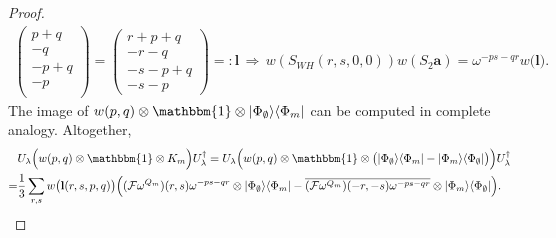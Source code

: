 \documentclass[aps,nofootinbib,floatfix,a4paper]{revtex4}
\newcommand{\1}{\mbox{$\mathbf{1}$}}
\def\F{\mathcal{F}}
\def\Id{\mathbbm{1}}
\renewcommand{\vec}{\mathbf}
\begin{document}
\begin{proof}
\begin{align*}
\begin{pmatrix}
			p+q\\
			-q\\
			-p+q\\
			-p\\
		\end{pmatrix}
		=
		\begin{pmatrix}
			r+p+q\\
			-r-q\\
			-s-p+q\\
			-s-p
		\end{pmatrix}
		=: \vec l
		\,\Rightarrow\,
		w(S_{WH} (r,s,0,0)) w(S_2 \vec a)
		=
		\omega^{-ps-qr}    %
		w\big(\vec l\big).
	\end{align*}
	The image of $ w(p,q)\otimes\Id \otimes |\Phi_\emptyset\rangle\langle\Phi_m|$ can be computed in complete analogy.
	Altogether,
	\begin{align}%
		&
		U_\lambda
		\Big(
			w(p,q)\otimes\Id
			\otimes 
			K_m
		\Big)
		U_\lambda^\dagger
		=
		U_\lambda
		\Big(
			w(p,q)\otimes\Id
			\otimes 
			\big(
				|\Phi_\emptyset\rangle\langle\Phi_m|
				-
				|\Phi_m\rangle\langle\Phi_\emptyset|
			\big)
		\Big)
		U_\lambda^\dagger
		\nonumber \\
		=&
			\frac1{3}
			\sum_{r,s}
			w\big(\vec l(r,s,p,q)\big)
		\Big(
			(\F \omega^{Q_m})(r,s)
				\omega^{-ps-qr}
				\otimes 
				|\Phi_\emptyset\rangle\langle\Phi_m|
				-
				\overline{(\F \omega^{Q_m})(-r,-s) \omega^{-ps-qr}}
				\otimes 
				|\Phi_m\rangle\langle\Phi_\emptyset|
			\Big). \label{eqn:k_deloc_res}
	\end{align}


\end{proof}
\end{document}
